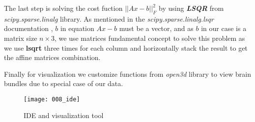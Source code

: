 \documentclass[../structure.tex]{subfiles}
\begin{document}
The last step is solving the cost fuction $||Ax-b||_{F}^2$ by using \textbf{\textit{LSQR}} from \textit{scipy.sparse.linalg} library. As mentioned in the \textit{scipy.sparse.linalg.lsqr} documentation \cite{Jones2001}, $b$ in equation $Ax-b$ must be a vector, and as $b$ in our case is a matrix size $n\times 3$, we use matrices fundamental concept to solve this problem as we use \textbf{lsqrt} three times for each column and horizontally stack the result to get the affine matrices combination.

Finally for visualization we customize functions from \textit{open3d} library to view brain bundles due to special case of our data.


\begin{figure}[h!]
\centering
\texttt{[image: 008\_ide]}
\captionsetup{justification=centering}
\caption{IDE and visualization tool}
\end{figure}
\end{document}
